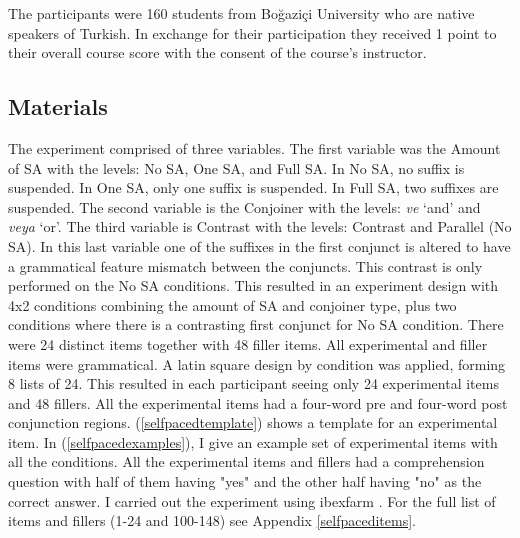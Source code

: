 The participants were 160 students from Boğaziçi University who are native speakers of Turkish. In exchange for their participation they received 1 point to their overall course score with the consent of the course's instructor.


\subsection{Materials}

The experiment comprised of three variables. The first variable was the Amount of SA with the levels: No SA, One SA, and Full SA.
In No SA, no suffix is suspended. In One SA, only one suffix is suspended. In Full SA, two suffixes are suspended. The second variable is the Conjoiner with the levels: \textit{ve} `and' and \textit{veya} `or'. The third variable is Contrast with the levels: Contrast and Parallel (No SA). In this last variable one of the suffixes in the first conjunct is altered to have a grammatical feature mismatch between the conjuncts. This contrast is only performed on the No SA conditions. This resulted in an experiment design with 4x2 conditions combining the amount of SA and conjoiner type, plus two conditions where there is a contrasting first conjunct for No SA condition. There were 24 distinct items together with 48 filler items. All experimental and filler items were grammatical. A latin square design by condition was applied, forming 8 lists of 24. This resulted in each participant seeing only 24 experimental items and 48 fillers. All the experimental items had a four-word pre and four-word post conjunction regions. (\ref{selfpacedtemplate}) shows a template for an experimental item. In (\ref{selfpacedexamples}), I give an example set of experimental items with all the conditions. All the experimental items and fillers had a comprehension question with half of them having "yes" and the other half having "no" as the correct answer. I carried out the experiment using ibexfarm \citep{drummond2013ibex}. For the full list of items and fillers (1-24 and 100-148) see Appendix \ref{selfpaceditems}.

